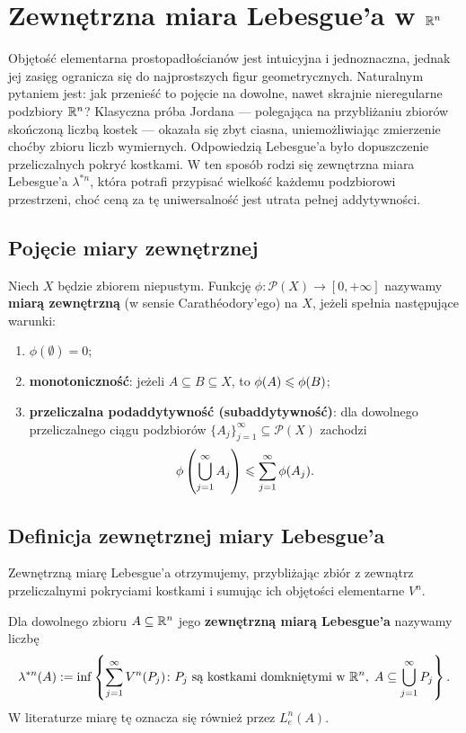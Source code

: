 \section{Zewnętrzna miara Lebesgue'a w $\mathbb{R}^{n}$}

Objętość elementarna prostopadłościanów jest intuicyjna i jednoznaczna, jednak jej zasięg ogranicza się do najprostszych figur geometrycznych. Naturalnym pytaniem jest: jak przenieść to pojęcie na dowolne, nawet skrajnie nieregularne podzbiory $\mathbb{R}^{n}$? Klasyczna próba Jordana — polegająca na przybliżaniu zbiorów skończoną liczbą kostek — okazała się zbyt ciasna, uniemożliwiając zmierzenie choćby zbioru liczb wymiernych. Odpowiedzią Lebesgue'a było dopuszczenie przeliczalnych pokryć kostkami. W ten sposób rodzi się zewnętrzna miara Lebesgue'a $\lambda^{*n}$, która potrafi przypisać wielkość każdemu podzbiorowi przestrzeni, choć ceną za tę uniwersalność jest utrata pełnej addytywności.

\subsection{Pojęcie miary zewnętrznej}

\begin{defi}
    Niech $X$ będzie zbiorem niepustym. Funkcję $\phi \colon \mathcal{P}(X) \to [0, +\infty]$ nazywamy \textbf{miarą zewnętrzną} (w sensie Carathéodory'ego) na $X$, jeżeli spełnia następujące warunki:
    \begin{enumerate}
        \item[(i)] $\phi(\emptyset) = 0$;
        \item[(ii)] \textbf{monotoniczność}: jeżeli $A \subseteq  B \subseteq  X$, to $\phi(A) \leqslant \phi(B)$;
        \item[(iii)] \textbf{przeliczalna podaddytywność (subaddytywność)}: dla dowolnego przeliczalnego ciągu podzbiorów $\{A_j\}_{j=1}^\infty \subseteq \mathcal{P}(X)$ zachodzi
              \begin{equation*}
                  \phi\left(\bigcup_{j=1}^\infty A_j\right) \leqslant \sum_{j=1}^\infty \phi(A_j).
              \end{equation*}
    \end{enumerate}
\end{defi}

\subsection{Definicja zewnętrznej miary Lebesgue'a} Zewnętrzną miarę Lebesgue'a otrzymujemy, przybliżając zbiór z zewnątrz przeliczalnymi pokryciami kostkami i sumując ich objętości elementarne $V^n$.
\begin{defi}
    Dla dowolnego zbioru $A \subseteq \mathbb{R}^{n}$ jego \textbf{zewnętrzną miarą Lebesgue'a} nazywamy liczbę
    \begin{equation*}
        \lambda^{*n}(A) := \inf \left\{ \sum_{j=1}^\infty V^n(P_j) \colon P_j \text{ są kostkami domkniętymi w } \mathbb{R}^{n}, \; A \subseteq \bigcup_{j=1}^\infty P_j \right\}.
    \end{equation*}
    W literaturze miarę tę oznacza się również przez $L_e^n(A)$.
\end{defi}


